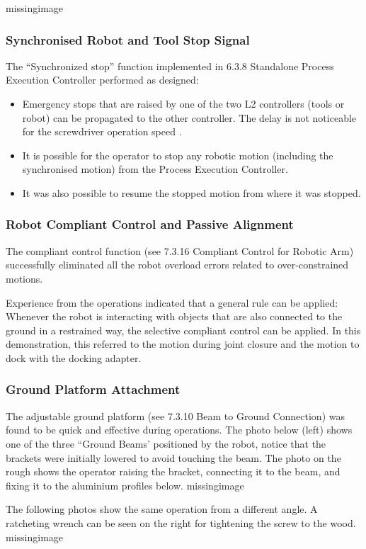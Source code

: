missingimage

\subsubsection{Synchronised Robot and Tool Stop Signal}
The “Synchronized stop” function implemented in 6.3.8 Standalone Process Execution Controller performed as designed:
\begin{itemize}
    \item Emergency stops that are raised by one of the two L2 controllers (tools or robot) can be propagated to the other controller. The delay is not noticeable for the screwdriver operation speed .
    \item It is possible for the operator to stop any robotic motion (including the synchronised motion) from the Process Execution Controller.
    \item It was also possible to resume the stopped motion from where it was stopped.
\end{itemize}

\subsubsection{Robot Compliant Control and Passive Alignment}
The compliant control function (see 7.3.16 Compliant Control for Robotic Arm) successfully eliminated all the robot overload errors related to over-constrained motions. 

Experience from the operations indicated that a general rule can be applied: Whenever the robot is interacting with objects that are also connected to the ground in a restrained way, the selective compliant control can be applied. In this demonstration, this referred to the motion during joint closure and the motion to dock with the docking adapter.

\subsubsection{Ground Platform Attachment}
The adjustable ground platform (see 7.3.10 Beam to Ground Connection) was found to be quick and effective during operations. The photo below (left) shows one of the three “Ground Beams' positioned by the robot, notice that the brackets were initially lowered to avoid touching the beam. The photo on the rough shows the operator raising the bracket, connecting it to the beam, and fixing it to the aluminium profiles below.
missingimage

The following photos show the same operation from a different angle. A ratcheting wrench can be seen on the right for tightening the screw to the wood.
missingimage

